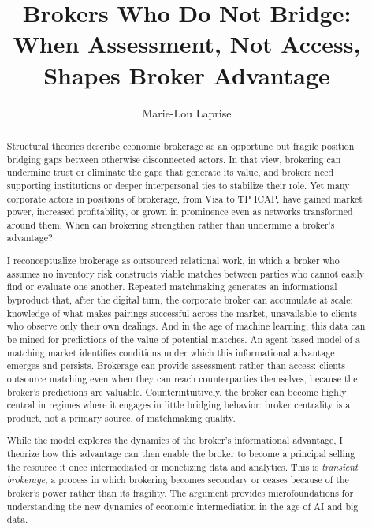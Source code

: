 \documentclass[
]{article}
\title{Brokers Who Do Not Bridge: \\When Assessment, Not Access, Shapes Broker Advantage}
\author{Marie-Lou Laprise}
\date{}
\begin{document}
\maketitle
\thispagestyle{workingpaperfirst}
\begin{abstract}
Structural theories describe economic brokerage as an opportune but fragile position bridging gaps between otherwise disconnected actors. In that view, brokering can undermine trust or eliminate the gaps that generate its value, and brokers need supporting institutions or deeper interpersonal ties to stabilize their role. Yet many corporate actors in positions of brokerage, from Visa to TP ICAP, have gained market power, increased profitability, or grown in prominence even as networks transformed around them. When can brokering strengthen rather than undermine a broker's advantage?

I reconceptualize brokerage as outsourced relational work, in which a broker who assumes no inventory risk constructs viable matches between parties who cannot easily find or evaluate one another. Repeated matchmaking generates an informational byproduct that, after the digital turn, the corporate broker can accumulate at scale: knowledge of what makes pairings successful across the market, unavailable to clients who observe only their own dealings. And in the age of machine learning, this data can be mined for predictions of the value of potential matches. An agent-based model of a matching market identifies conditions under which this informational advantage emerges and persists. Brokerage can provide assessment rather than access: clients outsource matching even when they can reach counterparties themselves, because the broker's predictions are valuable. Counterintuitively, the broker can become highly central in regimes where it engages in little bridging behavior: broker centrality is a product, not a primary source, of matchmaking quality.

While the model explores the dynamics of the broker's informational advantage, I theorize how this advantage can then enable the broker to become a principal selling the resource it once intermediated or monetizing data and analytics. This is \emph{transient brokerage}, a process in which brokering becomes secondary or ceases because of the broker’s power rather than its fragility. The argument provides microfoundations for understanding the new dynamics of economic intermediation in the age of AI and big data.
\end{abstract}
\end{document}
